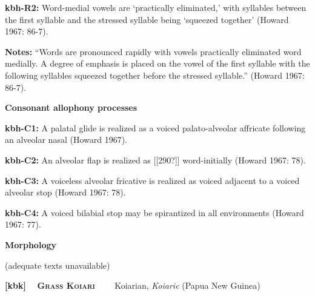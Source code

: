 \begin{styleBody}
\textbf{kbh-R2:} Word-medial vowels are ‘practically eliminated,’ with syllables between the first syllable and the stressed syllable being ‘squeezed together’ (Howard 1967: 86-7).
\end{styleBody}

\begin{styleBody}
\textbf{Notes: }“Words are pronounced rapidly with vowels practically eliminated word medially. A degree of emphasis is placed on the vowel of the first syllable with the following syllables squeezed together before the stressed syllable.” (Howard 1967: 86-7).
\end{styleBody}

\begin{styleBody}
\textbf{Consonant allophony processes}
\end{styleBody}

\begin{styleBody}
\textbf{kbh-C1: }A palatal glide is realized as a voiced palato-alveolar affricate following an alveolar nasal (Howard 1967).
\end{styleBody}

\begin{styleBody}
\textbf{kbh-C2: }An alveolar flap is realized as [[290?]] word-initially (Howard 1967: 78).
\end{styleBody}

\begin{styleBody}
\textbf{kbh-C3: }A voiceless alveolar fricative is realized as voiced adjacent to a voiced alveolar stop (Howard 1967: 78).
\end{styleBody}

\begin{styleBody}
\textbf{kbh-C4: }A voiced bilabial stop may be spirantized in all environments (Howard 1967: 77).
\end{styleBody}

\begin{styleBody}
\textbf{Morphology}
\end{styleBody}

\begin{styleBody}
(adequate texts unavailable)
\end{styleBody}

\clearpage\begin{styleBody}
\textbf{[kbk] }\ \ \textbf{\textsc{Grass Koiari}}\textbf{\ \ \ \ }Koiarian, \textit{Koiaric} (Papua New Guinea)
\end{styleBody}

